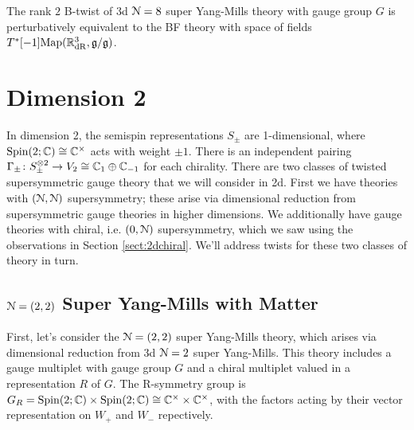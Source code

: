 \documentclass[10pt, oneside]{article}
\begin{document}
\begin{theorem} 
The rank $2$ B-twist of 3d $\mathcal{N}=8$ super Yang-Mills theory with gauge group $G$ is perturbatively equivalent to the BF theory with space of fields $T^*[-1]\mathrm{Map}(\mathbb R^3_{\mathrm{dR}}, \mathfrak{g}/\mathfrak{g})$. %
\end{theorem}

\section{Dimension 2}
In dimension 2, the semispin representations $S_\pm$ are 1-dimensional, where $\mathrm{Spin}(2;\mathbb C) \cong \mathbb C^\times$ acts with weight $\pm 1$.  There is an independent pairing $\Gamma_\pm \colon S_\pm^{\otimes 2} \to V_2 \cong \mathbb C_1 \oplus \mathbb C_{-1}$ for each chirality.  There are two classes of twisted supersymmetric gauge theory that we will consider in 2d.  First we have theories with $(\mathcal{N}, \mathcal{N})$ supersymmetry; these arise via dimensional reduction from supersymmetric gauge theories in higher dimensions.  We additionally have gauge theories with chiral, i.e. $(0,\mathcal{N})$ supersymmetry, which we saw using the observations in Section \ref{sect:2dchiral}.  We'll address twists for these two classes of theory in turn.

\subsection{\texorpdfstring{$\mathcal N=(2,2)$}{N=(2,2)} Super Yang-Mills with Matter} \label{sect:2d(2,2)}
First, let's consider the $\mathcal{N}=(2,2)$ super Yang-Mills theory, which arises via dimensional reduction from 3d $\mathcal{N}=2$ super Yang-Mills.  This theory includes a gauge multiplet with gauge group $G$ and a chiral multiplet valued in a representation $R$ of $G$.  The R-symmetry group is $G_R = \mathrm{Spin}(2;\mathbb C) \times \mathrm{Spin}(2;\mathbb C) \cong \mathbb C^\times \times \mathbb C^\times$, with the factors acting by their vector representation on $W_+$ and $W_-$ repectively.

\vspace{-10pt}
\end{document}
